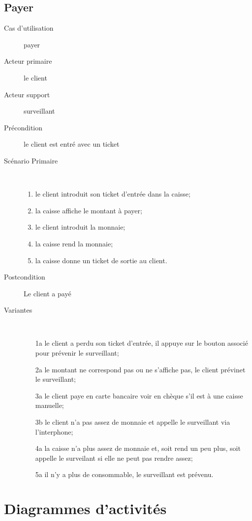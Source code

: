 \documentclass[a4paper]{article}
\begin{document}
\subsection{Payer}
\begin{description}
	\item[Cas d'utilisation] payer
	\item[Acteur primaire] le client
	\item[Acteur support] surveillant
	\item[Pr\'econdition] le client est entr\'e avec un ticket
	\item[Sc\'enario Primaire] \
	\begin{enumerate}
		\item le client introduit son ticket d'entr\'ee dans la caisse;
		\item la caisse affiche le montant \`a payer;
		\item le client introduit la monnaie;
		\item la caisse rend la monnaie;
		\item la caisse donne un ticket de sortie au client.
	\end{enumerate}
	\item[Postcondition] Le client a pay\'e
	\item[Variantes] \
	\begin{enumerate}
		\item[1a] le client a perdu son ticket d'entr\'ee, il appuye sur le
			bouton associ\'e pour pr\'evenir le surveillant;
		\item[2a] le montant ne correspond pas ou ne s'affiche pas, le client
			pr\'evinet le surveillant;
		\item[3a] le client paye en carte bancaire voir en ch\`eque s'il est
			\`a une caisse manuelle;
		\item[3b] le client n'a pas assez de monnaie et appelle le surveillant
			via l'interphone;
		\item[4a] la caisse n'a plus assez de monnaie et, soit rend un peu plus, soit
			appelle le surveilant si elle ne peut pas rendre assez;
		\item[5a] il n'y a plus de consommable, le surveillant est pr\'evenu.
	\end{enumerate}
\end{description}

\section{Diagrammes d'activit\'es}
\end{document}

